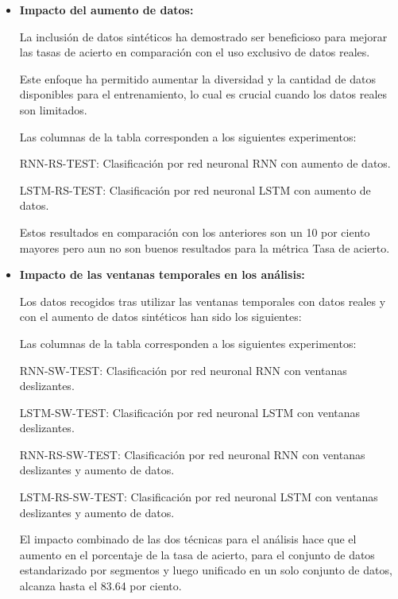 \begin{itemize}
	\item
	\textbf{Impacto del aumento de datos:}
	
	La inclusión de datos sintéticos ha demostrado ser beneficioso para mejorar las tasas de acierto en comparación con el uso exclusivo de datos reales. 
	
	Este enfoque ha permitido aumentar la diversidad y la cantidad de datos disponibles para el entrenamiento, lo cual es crucial cuando los datos reales son limitados.
	
	

	Las columnas de la tabla corresponden a los siguientes experimentos:

	RNN-RS-TEST: Clasificación por red neuronal RNN con aumento de datos.

	LSTM-RS-TEST: Clasificación por red neuronal LSTM con aumento de datos.

	Estos resultados en comparación con los anteriores son un 10 por ciento mayores pero aun no son buenos resultados para la métrica Tasa de acierto.
	

	\item
	\textbf{Impacto de las ventanas temporales en los análisis:}
	
	Los datos recogidos tras utilizar las ventanas temporales con datos reales y con el aumento de datos sintéticos han sido los siguientes:
	




	Las columnas de la tabla corresponden a los siguientes experimentos:

	RNN-SW-TEST: Clasificación por red neuronal RNN con ventanas deslizantes.

	LSTM-SW-TEST: Clasificación por red neuronal LSTM con ventanas deslizantes.

	RNN-RS-SW-TEST: Clasificación por red neuronal RNN con ventanas deslizantes y aumento de datos.

	LSTM-RS-SW-TEST: Clasificación por red neuronal LSTM con ventanas deslizantes y aumento de datos.

	
	El impacto combinado de las dos técnicas para el análisis hace que el aumento en el porcentaje de la tasa de acierto, para el conjunto de datos estandarizado por segmentos y luego unificado en un solo conjunto de datos, alcanza hasta el 83.64 por ciento.
	

\end{itemize}
